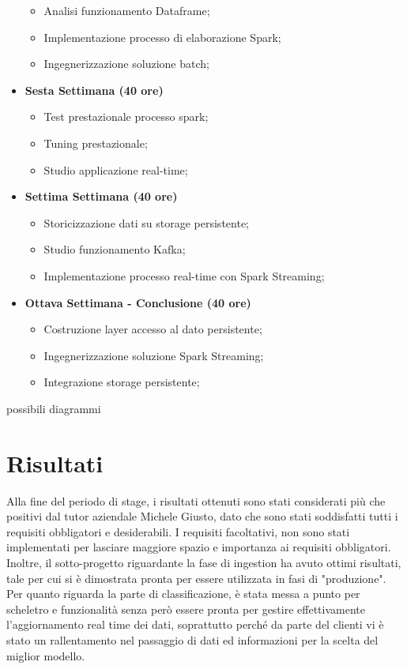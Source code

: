 \begin{itemize}
\begin{itemize}
		\item Analisi funzionamento Dataframe;
		\item Implementazione processo di elaborazione Spark;
		\item Ingegnerizzazione soluzione batch;
	\end{itemize}
	\item[] \textbf{Sesta Settimana (40 ore)} 
	\begin{itemize}
		\item Test prestazionale processo spark;
		\item Tuning prestazionale;
		\item Studio applicazione real-time;
	\end{itemize}
	\item[] \textbf{Settima Settimana (40 ore)} 
	\begin{itemize}
		\item Storicizzazione dati su storage persistente;
		\item Studio funzionamento Kafka;
		\item Implementazione processo real-time con Spark Streaming;
	\end{itemize}
	\item[] \textbf{Ottava Settimana - Conclusione (40 ore)} 
	\begin{itemize}
		\item Costruzione layer accesso al dato persistente;
		\item Ingegnerizzazione soluzione Spark Streaming;
		\item Integrazione storage persistente;
	\end{itemize}
\end{itemize}
possibili diagrammi
\section{Risultati}
Alla fine del periodo di stage, i risultati ottenuti sono stati considerati più che positivi dal tutor aziendale Michele Giusto, dato che sono stati soddisfatti tutti i requisiti obbligatori e desiderabili. I requisiti facoltativi, non sono stati implementati per lasciare maggiore spazio e importanza ai requisiti obbligatori.
\\
Inoltre, il sotto-progetto riguardante la fase di ingestion ha avuto ottimi risultati, tale per cui si è dimostrata pronta per essere utilizzata in fasi di "produzione".
Per quanto riguarda la parte di classificazione, è stata messa a punto per scheletro e funzionalità senza però essere pronta per gestire effettivamente l'aggiornamento real time dei dati, soprattutto perché da parte del clienti vi è stato un rallentamento nel passaggio di dati ed informazioni per la scelta del miglior modello. 


